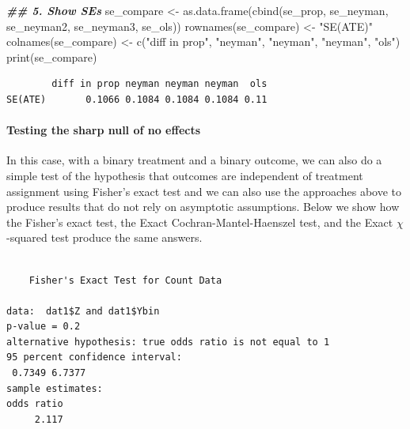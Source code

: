 \documentclass[
  12pt,
]{book}
\newenvironment{Shaded}{\begin{snugshade}}{\end{snugshade}}
\newcommand{\AttributeTok}[1]{\textcolor[rgb]{0.77,0.63,0.00}{#1}}
\newcommand{\DocumentationTok}[1]{\textcolor[rgb]{0.56,0.35,0.01}{\textbf{\textit{#1}}}}
\newcommand{\FunctionTok}[1]{\textcolor[rgb]{0.00,0.00,0.00}{#1}}
\newcommand{\NormalTok}[1]{#1}
\newcommand{\OtherTok}[1]{\textcolor[rgb]{0.56,0.35,0.01}{#1}}
\newcommand{\SpecialCharTok}[1]{\textcolor[rgb]{0.00,0.00,0.00}{#1}}
\newcommand{\StringTok}[1]{\textcolor[rgb]{0.31,0.60,0.02}{#1}}
\theoremstyle{definition}
\theoremstyle{definition}
\theoremstyle{definition}
\theoremstyle{remark}
\begin{document}
\begin{Shaded}
\begin{Highlighting}[]
\DocumentationTok{\#\# 5. Show SEs}
\NormalTok{se\_compare }\OtherTok{\textless{}{-}} \FunctionTok{as.data.frame}\NormalTok{(}\FunctionTok{cbind}\NormalTok{(se\_prop, se\_neyman, se\_neyman2, se\_neyman3, se\_ols))}
\FunctionTok{rownames}\NormalTok{(se\_compare) }\OtherTok{\textless{}{-}} \StringTok{"SE(ATE)"}
\FunctionTok{colnames}\NormalTok{(se\_compare) }\OtherTok{\textless{}{-}} \FunctionTok{c}\NormalTok{(}\StringTok{"diff in prop"}\NormalTok{, }\StringTok{"neyman"}\NormalTok{, }\StringTok{"neyman"}\NormalTok{, }\StringTok{"neyman"}\NormalTok{, }\StringTok{"ols"}\NormalTok{)}
\FunctionTok{print}\NormalTok{(se\_compare)}
\end{Highlighting}
\end{Shaded}

\begin{verbatim}
        diff in prop neyman neyman neyman  ols
SE(ATE)       0.1066 0.1084 0.1084 0.1084 0.11
\end{verbatim}

\hypertarget{testing-the-sharp-null-of-no-effects-1}{%
\paragraph{Testing the sharp null of no
effects}\label{testing-the-sharp-null-of-no-effects-1}}

In this case, with a binary treatment and a binary outcome, we can also
do a simple test of the hypothesis that outcomes are independent of
treatment assignment using Fisher's exact test and we can also use the
approaches above to produce results that do not rely on asymptotic
assumptions. Below we show how the Fisher's exact test, the Exact
Cochran-Mantel-Haenszel test, and the Exact \(\chi\)-squared test
produce the same answers.

\begin{Shaded}
\end{Shaded}

\begin{verbatim}

    Fisher's Exact Test for Count Data

data:  dat1$Z and dat1$Ybin
p-value = 0.2
alternative hypothesis: true odds ratio is not equal to 1
95 percent confidence interval:
 0.7349 6.7377
sample estimates:
odds ratio 
     2.117 
\end{verbatim}
\end{document}
